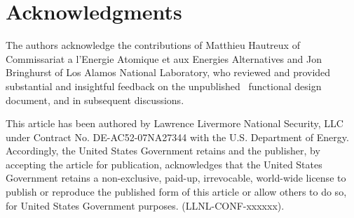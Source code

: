 \section {Acknowledgments}
The authors acknowledge the contributions of Matthieu Hautreux
of Commissariat a l'Energie Atomique et aux Energies Alternatives
and Jon Bringhurst of Los Alamos National Laboratory, who reviewed
and provided substantial and insightful feedback on the unpublished
\flux\ functional design document, and in subsequent discussions.
\ifcomments
{}
\fi

This article has been authored by Lawrence Livermore National Security, LLC
under Contract No. DE-AC52-07NA27344 with the U.S. Department of
Energy. Accordingly, the United States Government retains and the publisher,
by accepting the article for publication, acknowledges that the United States
Government retains a non-exclusive, paid-up, irrevocable, world-wide license
to publish or reproduce the published form of this article or allow others to
do so, for United States Government purposes. (LLNL-CONF-xxxxxx).
